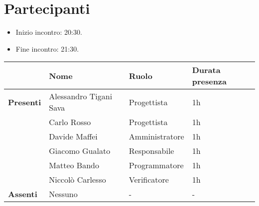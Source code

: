 \section*{Partecipanti}

\begin{itemize}
	\item Inizio incontro: 20:30.
	\item Fine incontro: 21:30.
\end{itemize}


\begin{center}
	\begin{tabular}{llll}
		                  & \textbf{Nome}          & \textbf{Ruolo} & \textbf{Durata presenza} \\
		\hline
		\textbf{Presenti} & Alessandro Tigani Sava & Progettista & 1h                    \\
		                  & Carlo Rosso            & Progettista       & 1h                       \\
		                  & Davide Maffei          & Amministratore   & 1h                       \\
		                  & Giacomo Gualato        & Responsabile       & 1h                       \\
		                  & Matteo Bando           & Programmatore       & 1h                       \\
		                  & Niccolò Carlesso       & Verificatore       & 1h                       \\
		\hline
		\textbf{Assenti}  & Nessuno                & -              & -                        \\
	\end{tabular}
\end{center}
